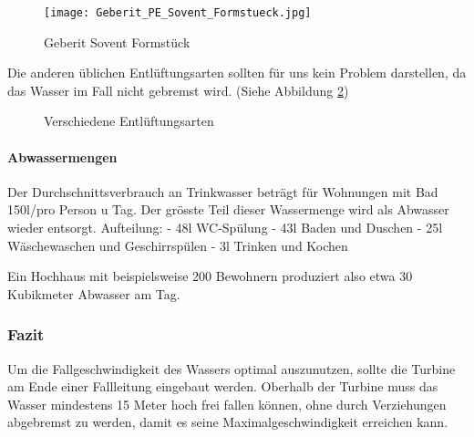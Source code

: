 \begin{figure}[H]
    \centering
    \texttt{[image: Geberit\_PE\_Sovent\_Formstueck.jpg]}
    \caption{Geberit Sovent Formstück \cite{geberit}}
	\label{fig:Sovent}
\end{figure}

Die anderen üblichen Entlüftungsarten sollten für uns kein Problem darstellen, da das Wasser im Fall nicht gebremst wird. (Siehe Abbildung \ref{fig:Entlüftungsarten})

\begin{figure}[H]
\centering
{}\;
\;
\caption{Verschiedene Entlüftungsarten \cite{docplayer}}
\label{fig:Entlüftungsarten}
\end{figure}

\paragraph{Abwassermengen}
Der Durchschnittsverbrauch an Trinkwasser beträgt für Wohnungen mit Bad 150l/pro Person u Tag. Der grösste Teil dieser Wassermenge wird als Abwasser wieder entsorgt. 
\newline
Aufteilung:
\newline
- 48l \; WC-Spülung
\newline
- 43l \; Baden und Duschen
\newline
- 25l \; Wäschewaschen und Geschirrspülen
\newline
- 3l \;  Trinken und Kochen
\newline
\cite{wohnbau}

Ein Hochhaus mit beispielsweise 200 Bewohnern produziert also etwa 30 Kubikmeter Abwasser am Tag.

\subsubsection{Fazit}
Um die Fallgeschwindigkeit des Wassers optimal auszunutzen, sollte die Turbine am Ende einer Fallleitung eingebaut werden. Oberhalb der Turbine muss das Wasser mindestens 15 Meter hoch frei fallen können, ohne durch Verziehungen abgebremst zu werden, damit es seine Maximalgeschwindigkeit erreichen kann. 


\clearpage 






